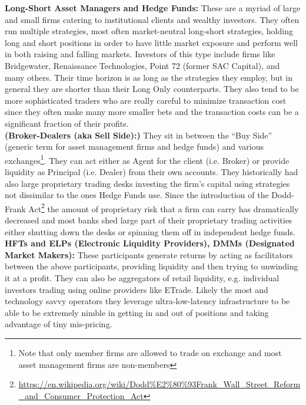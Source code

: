 \noindent\textbf{ Long-Short Asset Managers and Hedge Funds:} These are a myriad of large and small firms catering to institutional clients and wealthy investors. They often run multiple strategies, most often market-neutral long-short strategies, holding long and short positions in order to have little market exposure and  perform well in both raising and falling markets. Investors of this type include firms like Bridgewater, Renaissance Technologies, Point 72 (former SAC Capital), and many others. Their time horizon is as long as the strategies they employ, but in general they are shorter than their Long Only counterparts. They also tend to be more sophisticated traders who are really careful to minimize transaction cost since they often make many more smaller bets and the transaction costs can be a significant fraction of their profits. \\




\noindent\textbf{(Broker-Dealers (aka Sell Side):)} They sit in between the ``Buy Side'' (generic term for asset management firms and hedge funds) and various exchanges\footnote{Note that only member firms are allowed to trade on exchange and most asset management firms are non-members}. They can act either as Agent for the client (i.e. Broker) or provide liquidity as Principal (i.e. Dealer) from their own accounts. They historically had  also large proprietary trading desks investing the firm's capital using strategies not dissimilar to the ones Hedge Funds use. Since the introduction of the Dodd-Frank Act\footnote{\url{https://en.wikipedia.org/wiki/Dodd\%E2\%80\%93Frank_Wall_Street_Reform_and_Consumer_Protection_Act}} the amount of proprietary risk that a firm can carry has dramatically decreased and most banks shed large part of their proprietary trading activities either shutting down the desks or spinning them off in independent hedge funds. \\


\noindent\textbf{HFTs and ELPs (Electronic Liquidity Providers), DMMs (Designated Market Makers):} These participants generate returns by acting as facilitators between the above participants, providing liquidity and then trying to unwinding it at a profit. They can also be aggregators of retail liquidity, e.g. individual investors trading using online providers like ETrade. Likely the most and technology savvy operators they leverage ultra-low-latency infrastructure to be able to be extremely nimble in getting in and out of positions and taking advantage of tiny mis-pricing. 



